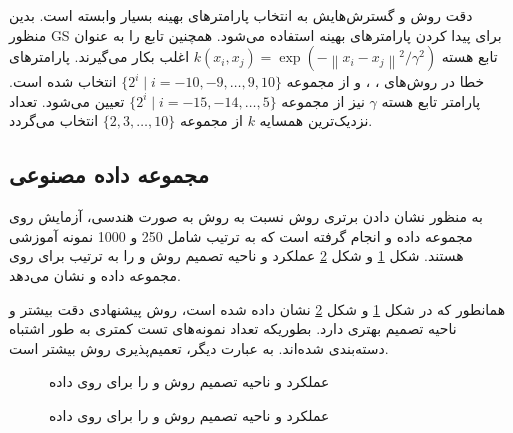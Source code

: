 دقت روش  و گسترش‌هایش به انتخاب پارامترهای بهینه بسیار وابسته است. بدین منظور \gls{GS}  برای پیدا کردن پارامترهای بهینه استفاده می‌شود. همچنین تابع  را به عنوان تابع هسته  $k(x_i, x_j)=\exp({-\left\|x_i - x_j\right\|^2}/\gamma^2)$ اغلب بکار می‌گیرند. پارامترهای خطا در روش‌های ، ،  و  از مجموعه  $\{2^i \mid i=-10, -9, \dots, 9, 10\}$ انتخاب شده است.  پارامتر تابع هسته $\gamma$  نیز از مجموعه  $\{2^i \mid i=-15, -14, \dots, 5\}$ تعیین می‌شود. تعداد نزدیک‌ترین همسایه  $k$ از مجموعه  $\{2,3, \dots, 10\}$ انتخاب می‌گردد.

\subsection{مجموعه داده مصنوعی}\label{sec:5:2:2}
به منظور نشان دادن برتری روش  نسبت به روش  به صورت هندسی، آزمایش روی مجموعه داده   \cite{ripley2007} و  \cite{ho1996} انجام گرفته است که به ترتیب شامل 250 و 1000 نمونه آموزشی هستند. شکل ‏\ref{fig:LSTSVM-vs-KNN-LSTSVM-R} و شکل \ref{fig:LSTSVM-vs-KNN-LSTSVM-C} عملکرد و ناحیه تصمیم روش  و  را به ترتیب برای روی مجموعه داده  و  نشان می‌دهد.

همانطور که در شکل ‏\ref{fig:LSTSVM-vs-KNN-LSTSVM-R} و شکل ‏\ref{fig:LSTSVM-vs-KNN-LSTSVM-C} نشان داده شده است، روش پیشنهادی  دقت بیشتر و ناحیه تصمیم بهتری دارد. بطوریکه تعداد نمونه‌های تست کمتری به طور اشتباه دسته‌بندی شده‌اند. به عبارت دیگر، تعمیم‌پذیری روش  بیشتر است.

\begin{figure}[!t]
	\centering
	\caption{عملکرد و ناحیه تصمیم روش   و   را برای روی داده  }
		\label{fig:LSTSVM-vs-KNN-LSTSVM-R}
\end{figure}

\begin{figure}[!ht]
	\centering
	\caption{عملکرد و ناحیه تصمیم روش   و   را برای روی داده  }
	\label{fig:LSTSVM-vs-KNN-LSTSVM-C}
\end{figure}

